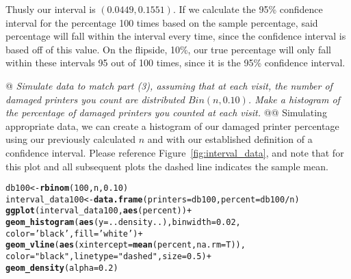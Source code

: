 \documentclass[10pt]{report}\usepackage[]{graphicx}\usepackage[]{xcolor}
\makeatletter
\newcommand{\hlnum}[1]{\textcolor[rgb]{0.686,0.059,0.569}{#1}}%
\newcommand{\hlstr}[1]{\textcolor[rgb]{0.192,0.494,0.8}{#1}}%
\newcommand{\hlopt}[1]{\textcolor[rgb]{0,0,0}{#1}}%
\newcommand{\hlstd}[1]{\textcolor[rgb]{0.345,0.345,0.345}{#1}}%
\newcommand{\hlkwb}[1]{\textcolor[rgb]{0.69,0.353,0.396}{#1}}%
\newcommand{\hlkwc}[1]{\textcolor[rgb]{0.333,0.667,0.333}{#1}}%
\newcommand{\hlkwd}[1]{\textcolor[rgb]{0.737,0.353,0.396}{\textbf{#1}}}%
\newenvironment{kframe}{%
 \def\at@end@of@kframe{}%
 \ifinner\ifhmode%
  \def\at@end@of@kframe{\end{minipage}}%
  \begin{minipage}{\columnwidth}%
 \fi\fi%
 \def\FrameCommand##1{\hskip\@totalleftmargin \hskip-\fboxsep
 \colorbox{shadecolor}{##1}\hskip-\fboxsep
     \hskip-\linewidth \hskip-\@totalleftmargin \hskip\columnwidth}%
 \MakeFramed {\advance\hsize-\width
   \@totalleftmargin\z@ \linewidth\hsize
   \@setminipage}}%
 {\par\unskip\endMakeFramed%
 \at@end@of@kframe}
\newenvironment{knitrout}{}{} %
\makeatother
\begin{document}
\begin{easylist}[enumerate]
        Thusly our interval is $\boxed{\left( 0.0449, 0.1551 \right)}$. If we calculate the 95\%
        confidence interval for the percentage 100 times based on the sample percentage, said percentage will fall
        within the interval every time, since the confidence interval is based off of this value. On the flipside, 10\%,
        our true percentage will only fall within these intervals 95 out of 100 times, since it is the 95\% confidence
        interval.

        \newpage
        @ \textit{Simulate data to match part (3), assuming that at each visit, the number of damaged printers you count
        are distributed $Bin(n, 0.10)$. Make a histogram of the percentage of damaged printers you counted at each
        visit.}
        @@ Simulating appropriate data, we can create a histogram of our damaged printer percentage using our previously
        calculated $n$ and with our established definition of a confidence interval. Please reference
        Figure~\ref{fig:interval_data}, and note that for this plot and all subsequent plots the dashed line indicates
        the sample mean.

\begin{knitrout}
\color{fgcolor}\begin{kframe}
\begin{alltt}
         \hlstd{db100} \hlkwb{<-} \hlkwd{rbinom}\hlstd{(}\hlnum{100}\hlstd{, n,} \hlnum{0.10}\hlstd{)}
         \hlstd{interval_data100} \hlkwb{<-} \hlkwd{data.frame}\hlstd{(}\hlkwc{printers}\hlstd{=db100,} \hlkwc{percent}\hlstd{=db100}\hlopt{/}\hlstd{n)}
         \hlkwd{ggplot}\hlstd{(interval_data100,} \hlkwd{aes}\hlstd{(percent))} \hlopt{+}
                    \hlkwd{geom_histogram}\hlstd{(}\hlkwd{aes}\hlstd{(}\hlkwc{y}\hlstd{=..density..),} \hlkwc{binwidth}\hlstd{=}\hlnum{0.02}\hlstd{,}
                                   \hlkwc{color}\hlstd{=}\hlstr{'black'}\hlstd{,} \hlkwc{fill}\hlstd{=}\hlstr{'white'}\hlstd{)} \hlopt{+}
                    \hlkwd{geom_vline}\hlstd{(}\hlkwd{aes}\hlstd{(}\hlkwc{xintercept}\hlstd{=}\hlkwd{mean}\hlstd{(percent,} \hlkwc{na.rm}\hlstd{=T)),}
                               \hlkwc{color}\hlstd{=}\hlstr{"black"}\hlstd{,} \hlkwc{linetype}\hlstd{=}\hlstr{"dashed"}\hlstd{,} \hlkwc{size}\hlstd{=}\hlnum{0.5}\hlstd{)} \hlopt{+}
                    \hlkwd{geom_density}\hlstd{(}\hlkwc{alpha}\hlstd{=}\hlnum{0.2}\hlstd{)}
\end{alltt}
\end{kframe}\begin{figure}[H]



\end{figure}
\end{knitrout}
\end{easylist}
\end{document}
